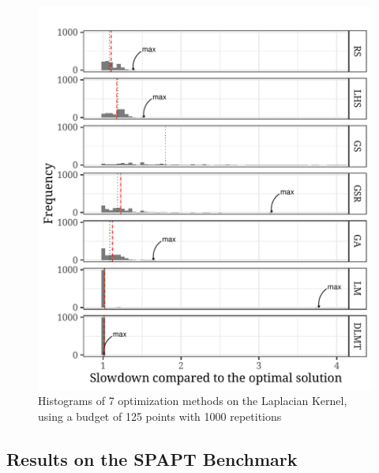 \documentclass[conference]{IEEEtran}
\begin{document}
\begin{center}
\begin{figure}[ht]
\centering
\includegraphics[width=.9\columnwidth]{./img/comparison_histogram.pdf}
\caption{Histograms of 7 optimization methods on the Laplacian Kernel, using a budget of 125 points with 1000 repetitions}
\end{figure}
\end{center}
\subsection{Results on the SPAPT Benchmark}
\label{sec:org2f7bbb6}
\end{document}
